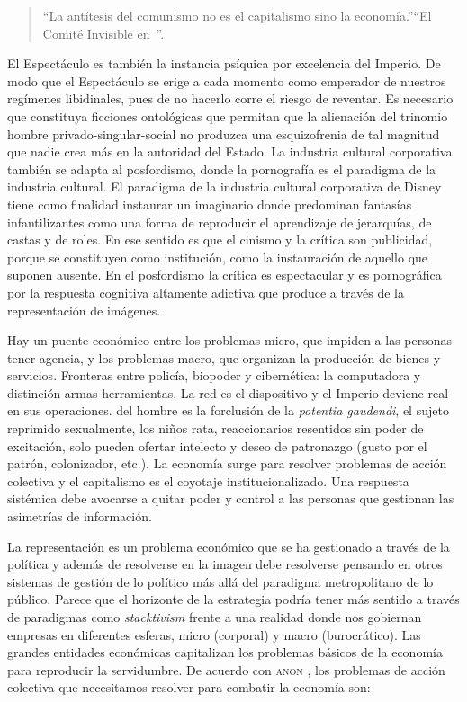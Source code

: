 \begin{quote}
  \enquote{La antítesis del comunismo no es el capitalismo sino la economía.}\enquote{El Comité Invisible en~\autocite{EconomiaConsideradaComo}}. 
\end{quote}

El Espectáculo es también la instancia psíquica por excelencia del Imperio. De modo que el Espectáculo se erige a cada momento como emperador de nuestros regímenes libidinales, pues de no hacerlo corre el riesgo de reventar. Es necesario que constituya ficciones ontológicas que permitan que la alienación del trinomio hombre privado-singular-social no produzca una esquizofrenia de tal magnitud que nadie crea más en la autoridad del Estado. La industria cultural corporativa también se adapta al posfordismo, donde la pornografía es el paradigma de la industria cultural. El paradigma de la industria cultural corporativa de Disney tiene como finalidad instaurar un imaginario donde predominan fantasías infantilizantes como una forma de reproducir el aprendizaje de jerarquías, de castas y de roles. En ese sentido es que el cinismo y la crítica son publicidad, porque se constituyen como institución, como la instauración de aquello que suponen ausente. En el posfordismo la crítica es espectacular y es pornográfica por la respuesta cognitiva altamente adictiva que produce a través de la representación de imágenes.

Hay un puente económico entre los problemas micro, que impiden a las personas tener agencia, y los problemas macro, que organizan la producción de bienes y servicios. Fronteras entre policía, biopoder y cibernética: la computadora y distinción armas-herramientas. La red es el dispositivo y el Imperio deviene real en sus operaciones.  del hombre es la forclusión de la \emph{potentia gaudendi}, el sujeto reprimido sexualmente, los niños rata, reaccionarios resentidos sin poder de excitación, solo pueden ofertar intelecto y deseo de patronazgo (gusto por el patrón, colonizador, etc.). La economía surge para resolver problemas de acción colectiva y el capitalismo es el coyotaje institucionalizado. Una respuesta sistémica debe avocarse a quitar poder y control a las personas que gestionan las asimetrías de información.

La representación es un problema económico que se ha gestionado a través de la política y además de resolverse en la imagen debe resolverse pensando en otros sistemas de gestión de lo político más allá del paradigma metropolitano de lo público. Parece que el horizonte de la estrategia podría tener más sentido a través de paradigmas como \emph{stacktivism} \autocite{brattonStackSoftwareSovereignty2015} frente a una realidad donde nos gobiernan empresas en diferentes esferas, micro (corporal) y macro (burocrático). Las grandes entidades económicas capitalizan los problemas básicos de la economía para reproducir la servidumbre. De acuerdo con \textsc{anon} \autocite{PeopleArePeople2018}, los problemas de acción colectiva que necesitamos resolver para combatir la economía son:

